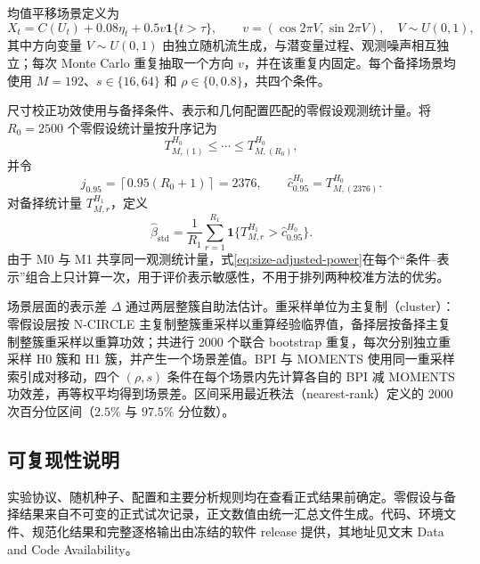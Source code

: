 均值平移场景定义为
\begin{equation}\label{eq:mean-alt}
 X_t=C(U_t)+0.08\eta_t+0.5v\mathbf1\{t>\tau\},
 \qquad
 v=(\cos2\pi V,\sin2\pi V),\quad V\sim U(0,1),
\end{equation}
其中方向变量 $V\sim U(0,1)$ 由独立随机流生成，与潜变量过程、观测噪声相互独立；每次 Monte Carlo 重复抽取一个方向 $v$，并在该重复内固定。每个备择场景均使用 $M=192$、$s\in\{16,64\}$ 和 $\rho\in\{0,0.8\}$，共四个条件。

尺寸校正功效使用与备择条件、表示和几何配置匹配的零假设观测统计量。将 $R_0=2500$ 个零假设统计量按升序记为
\[
 T_{M,(1)}^{H_0}\le\cdots\le T_{M,(R_0)}^{H_0},
\]
并令
\begin{equation}\label{eq:h0-critical}
 j_{0.95}=\left\lceil0.95(R_0+1)\right\rceil=2376,
 \qquad
 \widehat c_{0.95}^{H_0}=T_{M,(2376)}^{H_0}.
\end{equation}
对备择统计量 $T_{M,r}^{H_1}$，定义
\begin{equation}\label{eq:size-adjusted-power}
 \widehat\beta_{\mathrm{std}}
 =\frac1{R_1}\sum_{r=1}^{R_1}
 \mathbf1\{T_{M,r}^{H_1}>\widehat c_{0.95}^{H_0}\}.
\end{equation}
由于 M0 与 M1 共享同一观测统计量，式\eqref{eq:size-adjusted-power}在每个“条件--表示”组合上只计算一次，用于评价表示敏感性，不用于排列两种校准方法的优劣。

场景层面的表示差 $\Delta$ 通过两层整簇自助法估计。重采样单位为主复制（cluster）：零假设层按 N-CIRCLE 主复制整簇重采样以重算经验临界值，备择层按备择主复制整簇重采样以重算功效；共进行 2000 个联合 bootstrap 重复，每次分别独立重采样 H0 簇和 H1 簇，并产生一个场景差值。BPI 与 MOMENTS 使用同一重采样索引成对移动，四个 $(\rho,s)$ 条件在每个场景内先计算各自的 BPI 减 MOMENTS 功效差，再等权平均得到场景差。区间采用最近秩法（nearest-rank）定义的 2000 次百分位区间（$2.5\%$ 与 $97.5\%$ 分位数）。

\subsection{可复现性说明}\label{sec:repro}

实验协议、随机种子、配置和主要分析规则均在查看正式结果前确定。零假设与备择结果来自不可变的正式试次记录，正文数值由统一汇总文件生成。代码、环境文件、规范化结果和完整逐格输出由冻结的软件 release 提供，其地址见文末 Data and Code Availability。
